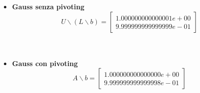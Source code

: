 \begin{enumerate}
\begin{itemize}
\item \textbf{Gauss senza pivoting}
\[
U \backslash (L \backslash b) = \begin{bmatrix}
	1.000000000000001e+00 \\
    9.999999999999999e-01
\end{bmatrix}
\]\\\
\end{itemize}
\begin{itemize}
\item \textbf{Gauss con pivoting}
\[
A \backslash b =\begin{bmatrix}
	1.000000000000000e+00 \\
    9.999999999999998e-01 
\end{bmatrix}
\]
\end{itemize}
\end{enumerate}